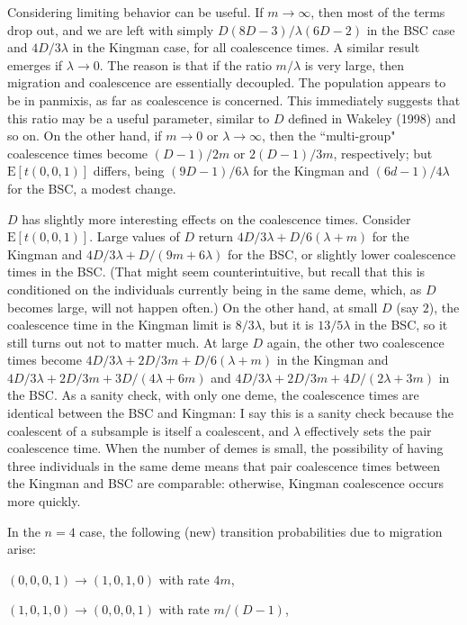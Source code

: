 \documentclass[rmp]{revtex4}
\begin{document}
Considering limiting behavior can be useful.
If $m \to \infty$, then most of the terms drop out, and we are left with simply $D(8D-3)/\lambda (6D-2)$ in the BSC case and $4D/3\lambda$ in the Kingman case, for all coalescence times.
A similar result emerges if $\lambda \to 0$.
The reason is that if the ratio $m/\lambda$ is very large, then migration and coalescence are essentially decoupled.
The population appears to be in panmixis, as far as coalescence is concerned.
This immediately suggests that this ratio may be a useful parameter, similar to $D$ defined in Wakeley (1998) and so on.
On the other hand, if $m \to 0$ or $\lambda \to \infty$, then the ``multi-group" coalescence times become $(D-1)/2m$ or $2(D-1)/3m$, respectively; but $\mathrm{E} \left[ t(0,0,1) \right]$ differs, being $(9D-1)/6\lambda$ for the Kingman and $(6d-1)/4\lambda$ for the BSC, a modest change.

$D$ has slightly more interesting effects on the coalescence times.
Consider $\mathrm{E} \left[ t(0,0,1) \right]$.
Large values of $D$ return $4D/3\lambda + D/6(\lambda+m)$ for the Kingman and $4D/3\lambda + D/(9m+6\lambda)$ for the BSC, or slightly lower coalescence times in the BSC.
(That might seem counterintuitive, but recall that this is conditioned on the individuals currently being in the same deme, which, as $D$ becomes large, will not happen often.)
On the other hand, at small $D$ (say $2$), the coalescence time in the Kingman limit is $8/3\lambda$, but it is $13/5\lambda$ in the BSC, so it still turns out not to matter much.
At large $D$ again, the other two coalescence times become $4D/3\lambda + 2D/3m + D/6(\lambda+m)$ in the Kingman and $4D/3\lambda + 2D/3m + 3D/(4\lambda+6m)$ and $4D/3\lambda + 2D/3m + 4D/(2\lambda+3m)$ in the BSC.
As a sanity check, with only one deme, the coalescence times are identical between the BSC and Kingman: I say this is a sanity check because the coalescent of a subsample is itself a coalescent, and $\lambda$ effectively sets the pair coalescence time.
When the number of demes is small, the possibility of having three individuals in the same deme means that pair coalescence times between the Kingman and BSC are comparable: otherwise, Kingman coalescence occurs more quickly.




In the $n=4$ case, the following (new) transition probabilities due to migration arise:

$(0,0,0,1) \to (1,0,1,0)$ with rate $4m$,

$(1,0,1,0) \to (0,0,0,1)$ with rate $m/(D-1)$,
\end{document}
